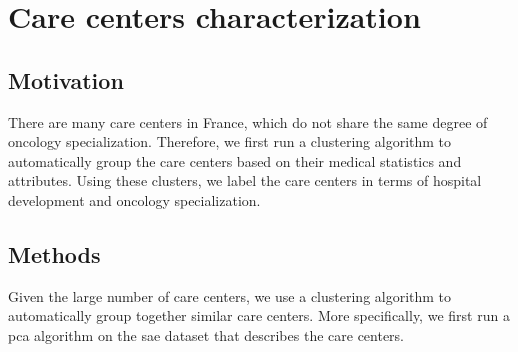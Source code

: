 \chapter{Care centers characterization}

\section{Motivation}

There are many care centers in France, which do not share the same degree of oncology specialization. Therefore, we first run a clustering algorithm to automatically group the care centers based on their medical statistics and attributes. Using these clusters, we label the care centers in terms of hospital development and oncology specialization.

\section{Methods}

Given the large number of care centers, we use a clustering algorithm to automatically group together similar care centers. More specifically, we first run a \ac{pca} algorithm on the \ac{sae} dataset that describes the care centers.

